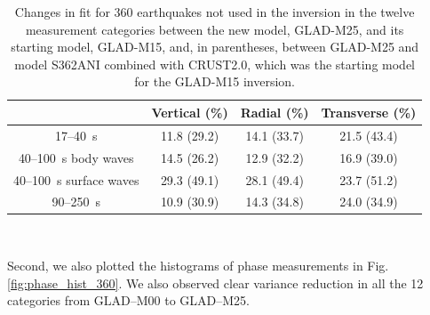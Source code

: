 \documentclass[extra,mreferee]{gji}
\begin{document}
\begin{table}[!htb]
  \centering
  \begin{tabular}{|c|c|c|c|}
  \hline
  ~          &  Vertical (\%) & Radial (\%) &  Transverse (\%) \\
  \hline
  17--40~s                &          11.8 (29.2) &       14.1 (33.7) &       21.5 (43.4) \\
  40--100~s body waves    &          14.5 (26.2) &       12.9 (32.2)  &       16.9 (39.0) \\
  40--100~s surface waves &          29.3 (49.1) &       28.1 (49.4) &       23.7 (51.2) \\
  90--250~s               &          10.9 (30.9) &       14.3 (34.8)  &       24.0 (34.9) \\
  \hline
  \end{tabular}\\
  \caption{Changes in fit for 360 earthquakes not used in the inversion in the twelve measurement categories
between the new model, GLAD-M25, and its starting model, GLAD-M15, and, in parentheses, between GLAD-M25 and model S362ANI combined with CRUST2.0, which was the starting model for the GLAD-M15 inversion.}
  \label{table:misfit_reduction_M15_M25_360}
\end{table}


Second, we also plotted the histograms of phase measurements in Fig.\ref{fig:phase_hist_360}. We also observed clear variance reduction in all the 12 categories from GLAD--M00 to GLAD--M25.
\end{document}
